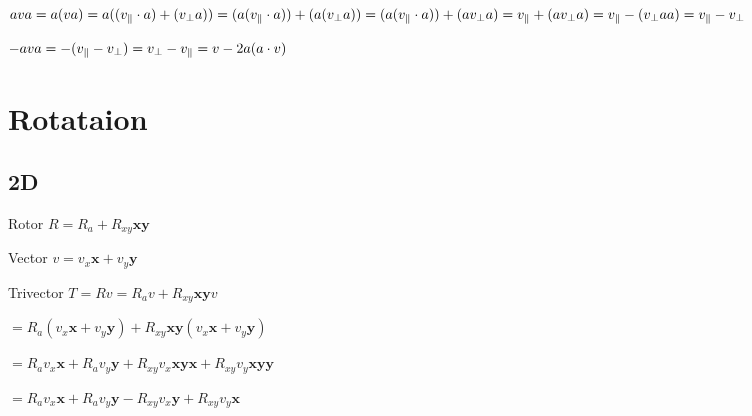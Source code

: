 \documentclass[14pt]{extarticle}
\begin{document}
\(
  ava \\
  = a (v a) \\
  = a ((v_\parallel \cdot a) + (v_\perp a)) \\
  = (a (v_\parallel \cdot a)) + (a (v_\perp a)) \\
  = (a (v_\parallel \cdot a)) + (a v_\perp a) \\
  = v_\parallel + (a v_\perp a) \\
  = v_\parallel - (v_\perp a a) \\
  = v_\parallel - v_\perp
\)

\(
  -ava \\
  = -(v_\parallel - v_\perp)\\
  = v_\perp - v_\parallel \\
  = v - 2 a (a \cdot v)
\)

%
%

\pagebreak
\section{Rotataion}
\label{sec:rotation}

%
%
%
%
%
%

\subsection{2D}
\label{subsec:rotation-2D}

Rotor \( R = R_a + R_{xy} \mathbf{xy} \)

Vector \( v = v_x \mathbf{x} + v_y \mathbf{y} \)

Trivector \( T = R v = R_a v + R_{xy} \mathbf{xy} v \)

\(
  = R_a (v_x \mathbf{x} + v_y \mathbf{y})
  + R_{xy} \mathbf{xy} (v_x \mathbf{x} + v_y \mathbf{y})
\)

\(
  = R_a v_x \mathbf{x} + R_a v_y \mathbf{y}
  + R_{xy} v_x \mathbf{xyx} + R_{xy} v_y \mathbf{xyy}
\)

\(
  = R_a v_x \mathbf{x} + R_a v_y \mathbf{y}
  - R_{xy} v_x \mathbf{y} + R_{xy} v_y \mathbf{x}
\)
\end{document}

